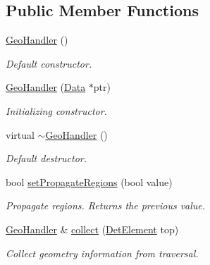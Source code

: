 \subsection*{Public Member Functions}
\begin{DoxyCompactItemize}
\item 
\hyperlink{class_d_d4hep_1_1_geometry_1_1_geo_handler_abbce30079f47cd87244d2d5ac2e301e4}{GeoHandler} ()
\begin{DoxyCompactList}\small\item\em Default constructor. \item\end{DoxyCompactList}\item 
\hyperlink{class_d_d4hep_1_1_geometry_1_1_geo_handler_a247d32d9a08a552eb6716c573c062eb1}{GeoHandler} (\hyperlink{class_d_d4hep_1_1_geometry_1_1_geo_handler_types_a568935b7e878d3ea9fe97a2ecf33d641}{Data} $\ast$ptr)
\begin{DoxyCompactList}\small\item\em Initializing constructor. \item\end{DoxyCompactList}\item 
virtual \hyperlink{class_d_d4hep_1_1_geometry_1_1_geo_handler_abb339356d911217c99b0869573d5284f}{$\sim$GeoHandler} ()
\begin{DoxyCompactList}\small\item\em Default destructor. \item\end{DoxyCompactList}\item 
bool \hyperlink{class_d_d4hep_1_1_geometry_1_1_geo_handler_aeaade3e58229faddb647861b301680e5}{setPropagateRegions} (bool value)
\begin{DoxyCompactList}\small\item\em Propagate regions. Returns the previous value. \item\end{DoxyCompactList}\item 
\hyperlink{class_d_d4hep_1_1_geometry_1_1_geo_handler}{GeoHandler} \& \hyperlink{class_d_d4hep_1_1_geometry_1_1_geo_handler_acdff622f718b2f71d40744f4665b80e9}{collect} (\hyperlink{class_d_d4hep_1_1_geometry_1_1_det_element}{DetElement} top)
\begin{DoxyCompactList}\small\item\em Collect geometry information from traversal. \item\end{DoxyCompactList}\item 

\end{DoxyCompactItemize}
